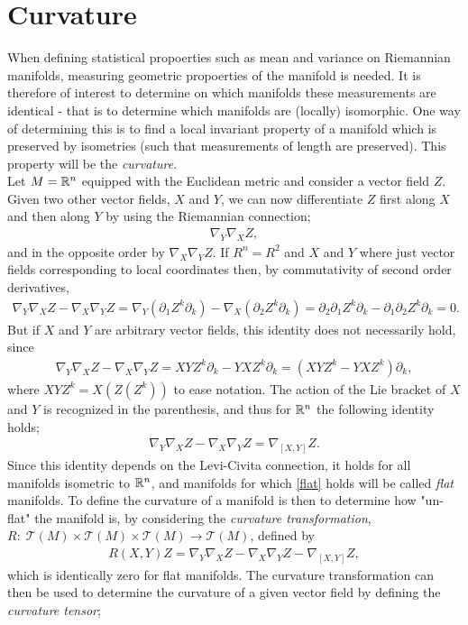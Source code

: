 \section{Curvature}

When defining statistical propoerties such as mean and variance on Riemannian manifolds, measuring geometric propoerties of the manifold is needed. It is therefore of interest to determine on which manifolds these measurements are identical - that is to determine which manifolds are (locally) isomorphic. One way of determining this is to find a local invariant property of a manifold which is preserved by isometries (such that measurements of length are preserved). This property will be the \textit{curvature}. \\[0.2 cm]

Let $M = \mathbb{R}^n$ equipped with the Euclidean metric and consider a vector field $Z$. Given two other vector fields, $X$ and $Y$, we can now differentiate $Z$ first along $X$ and then along $Y$ by using the Riemannian connection;
\begin{align*}
\nabla_Y \nabla_X Z,
\end{align*}
and in the opposite order by $\nabla_X \nabla_Y Z$. If $R^n = R^2$ and $X$ and $Y$ where just vector fields corresponding to local coordinates then, by commutativity of second order derivatives,
\begin{align*}
\nabla_Y \nabla_X Z - \nabla_X \nabla_Y Z = \nabla_Y (\partial_1 Z^k \partial_k) - \nabla_X (\partial_2 Z^k \partial_k) = \partial_2 \partial_1 Z^k \partial_k - \partial_1 \partial_2 Z^k \partial_k = 0.
\end{align*}
But if $X$ and $Y$ are arbitrary vector fields, this identity does not necessarily hold, since
\begin{align*}
\nabla_Y \nabla_X Z - \nabla_X \nabla_Y Z = XYZ^k \partial_k - YXZ^k \partial_k = (XYZ^k - YXZ^k)\partial_k,
\end{align*}
where $XYZ^k = X \left( Z \left( Z^k \right) \right)$ to ease notation. The action of the Lie bracket of $X$ and $Y$ is recognized in the parenthesis, and thus for $\mathbb{R}^n$ the following identity holds;
\begin{align}\label{flat}
\nabla_Y \nabla_X Z - \nabla_X \nabla_Y Z = \nabla_{[X,Y]} Z.
\end{align}
Since this identity depends on the Levi-Civita connection, it holds for all manifolds isometric to $\mathbb{R}^n$, and manifolds for which \ref{flat} holds will be called \textit{flat} manifolds. To define the curvature of a manifold is then to determine how "un-flat" the manifold is, by considering the \textit{curvature transformation}, $R: \; \mathcal{T}(M) \times \mathcal{T}(M) \times \mathcal{T}(M) \rightarrow \mathcal{T}(M)$, defined by
\begin{align*}
R(X,Y)Z =  \nabla_Y \nabla_X Z - \nabla_X \nabla_Y Z - \nabla_{[X,Y]} Z,
\end{align*}
which is identically zero for flat manifolds. The curvature transformation can then be used to determine the curvature of a given vector field by defining the \textit{curvature tensor};

